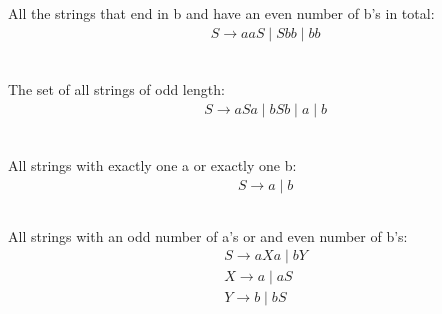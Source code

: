 \documentclass[12pt,a4paper,oneside]{report}
\begin{document}
\subsection{}
All the strings that end in b and have an even number of b's in total:
\begin{equation}
\begin{split}
&S \rightarrow aaS \mid Sbb \mid bb\\
\end{split}
\end{equation}
\subsection{}
The set of all strings of odd length:
\begin{equation}
\begin{split}
&S \rightarrow aSa \mid bSb \mid a \mid b\\
\end{split}
\end{equation}
\subsection{}
All strings with exactly one a or exactly one b:
\begin{equation}
\begin{split}
&S \rightarrow a \mid b 
\end{split}
\end{equation}
\subsection{}

All strings with an odd number of a's or and even number of b's:
\begin{equation}
\begin{split}
&S \rightarrow aXa \mid bY\\
&X \rightarrow a \mid aS\\
&Y \rightarrow b \mid bS
\end{split}
\end{equation}
\end{document}
